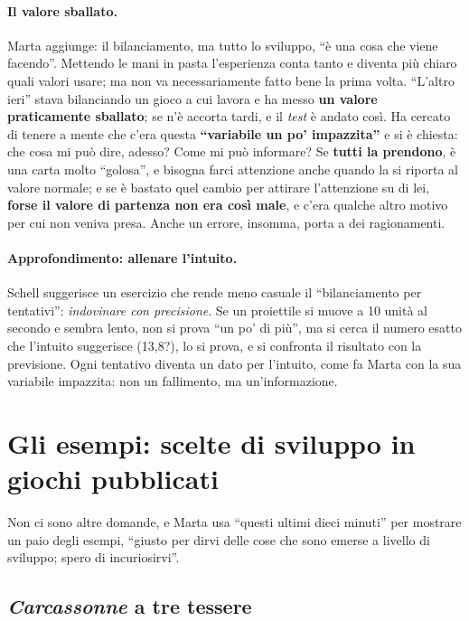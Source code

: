\paragraph{Il valore sballato.} Marta aggiunge: il bilanciamento, ma tutto lo sviluppo, ``è una
cosa che viene facendo''. Mettendo le mani in pasta l'esperienza conta tanto e diventa più
chiaro quali valori usare; ma non va necessariamente fatto bene la prima volta. ``L'altro ieri''
stava bilanciando un gioco a cui lavora e ha messo \textbf{un valore praticamente sballato}; se
n'è accorta tardi, e il \emph{test} è andato così. Ha cercato di tenere a mente che c'era
questa \textbf{``variabile un po' impazzita''} e si è chiesta: che cosa mi può dire, adesso? Come
mi può informare? Se \textbf{tutti la prendono}, è una carta molto ``golosa'', e bisogna farci
attenzione anche quando la si riporta al valore normale; e se è bastato quel cambio per
attirare l'attenzione su di lei, \textbf{forse il valore di partenza non era così male}, e
c'era qualche altro motivo per cui non veniva presa. Anche un errore, insomma, porta a dei
ragionamenti.

\paragraph{Approfondimento: allenare l'intuito.} Schell suggerisce un esercizio che rende meno
casuale il ``bilanciamento per tentativi'': \emph{indovinare con precisione}. Se un proiettile
si muove a 10 unità al secondo e sembra lento, non si prova ``un po' di più'', ma si cerca il
numero esatto che l'intuito suggerisce (13,8?), lo si prova, e si confronta il risultato con la
previsione. Ogni tentativo diventa un dato per l'intuito, come fa Marta con la sua variabile
impazzita: non un fallimento, ma un'informazione.

\section{Gli esempi: scelte di sviluppo in giochi pubblicati}
\label{a14:sec:esempi}

Non ci sono altre domande, e Marta usa ``questi ultimi dieci minuti'' per mostrare un paio
degli esempi, ``giusto per dirvi delle cose che sono emerse a livello di sviluppo; spero di
incuriosirvi''.

\subsection{\emph{Carcassonne} a tre tessere}

